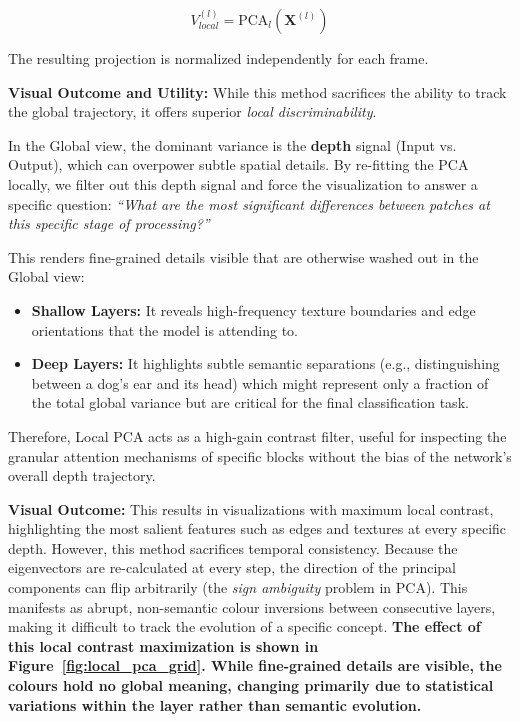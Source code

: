 \documentclass[oneside]{ctuthesis}
\begin{document}
\begin{equation}
    V^{(l)}_{local} = \text{PCA}_{l}(\mathbf{X}^{(l)})
\end{equation}

The resulting projection is normalized independently for each frame.

\textbf{Visual Outcome and Utility:}
While this method sacrifices the ability to track the global trajectory, it offers superior \textit{local discriminability}. 

In the Global view, the dominant variance is the \textbf{depth} signal (Input vs. Output), which can overpower subtle spatial details. By re-fitting the PCA locally, we filter out this depth signal and force the visualization to answer a specific question: \textit{``What are the most significant differences between patches at this specific stage of processing?''}

This renders fine-grained details visible that are otherwise washed out in the Global view:
\begin{itemize}
    \item \textbf{Shallow Layers:} It reveals high-frequency texture boundaries and edge orientations that the model is attending to.
    \item \textbf{Deep Layers:} It highlights subtle semantic separations (e.g., distinguishing between a dog's ear and its head) which might represent only a fraction of the total global variance but are critical for the final classification task.
\end{itemize}

Therefore, Local PCA acts as a high-gain contrast filter, useful for inspecting the granular attention mechanisms of specific blocks without the bias of the network's overall depth trajectory.

\textbf{Visual Outcome:} This results in visualizations with maximum local contrast, highlighting the most salient features such as edges and textures at every specific depth. However, this method sacrifices temporal consistency. Because the eigenvectors are re-calculated at every step, the direction of the principal components can flip arbitrarily (the \textit{sign ambiguity} problem in PCA). This manifests as abrupt, non-semantic colour inversions between consecutive layers, making it difficult to track the evolution of a specific concept. \textbf{The effect of this local contrast maximization is shown in Figure~\ref{fig:local_pca_grid}. While fine-grained details are visible, the colours hold no global meaning, changing primarily due to statistical variations within the layer rather than semantic evolution.}
\end{document}
